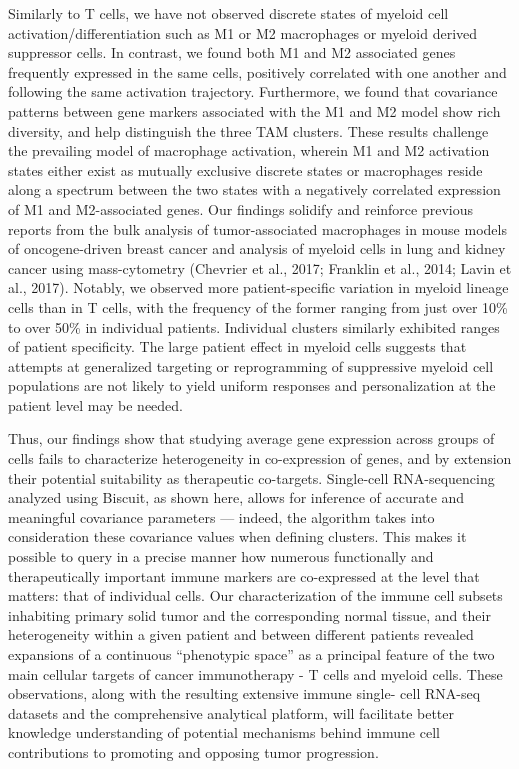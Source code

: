Similarly to T cells, we have not observed discrete states of myeloid cell activation/differentiation such as M1 or M2 macrophages or myeloid derived suppressor cells. 
In contrast, we found both M1 and M2 associated genes frequently expressed in the same cells, positively correlated with one another and following the same activation trajectory. 
Furthermore, we found that covariance patterns between gene markers associated with the M1 and M2 model show rich diversity, and help distinguish the three TAM clusters. 
These results challenge the prevailing model of macrophage activation, wherein M1 and M2 activation states either exist as mutually exclusive discrete states or macrophages reside along a spectrum between the two states with a negatively correlated expression of M1 and M2-associated genes. 
Our findings solidify and reinforce previous reports from the bulk analysis of tumor-associated macrophages in mouse models of oncogene-driven breast cancer and analysis of myeloid cells in lung and kidney cancer using mass-cytometry (Chevrier et al., 2017; Franklin et al., 2014; Lavin et al., 2017). %
Notably, we observed more patient-specific variation in myeloid lineage cells than in T cells, with the frequency of the former ranging from just over 10\% to over 50\% in individual patients.  
Individual clusters similarly exhibited ranges of patient specificity.
The large patient effect in myeloid cells suggests that attempts at generalized targeting or reprogramming of suppressive myeloid cell populations are not likely to yield uniform responses and personalization at the patient level may be needed.

Thus, our findings show that studying average gene expression across groups of cells fails to characterize heterogeneity in co-expression of genes, and by extension their potential suitability as therapeutic co-targets. 
Single-cell RNA-sequencing analyzed using Biscuit, as shown here, allows for inference of accurate and meaningful covariance parameters --- indeed, the algorithm takes into consideration these covariance values when defining clusters. 
This makes it possible to query in a precise manner how numerous functionally and therapeutically important immune markers are co-expressed at the level that matters: that of individual cells. 
Our characterization of the immune cell subsets inhabiting primary solid tumor and the corresponding normal tissue, and their heterogeneity within a given patient and between different patients revealed expansions of a continuous ``phenotypic space'' as a principal feature of the two main cellular targets of cancer immunotherapy - T cells and myeloid cells. 
These observations, along with the resulting extensive immune single- cell RNA-seq datasets and the comprehensive analytical platform, will facilitate better knowledge understanding of potential mechanisms behind immune cell contributions to promoting and opposing tumor progression. 

